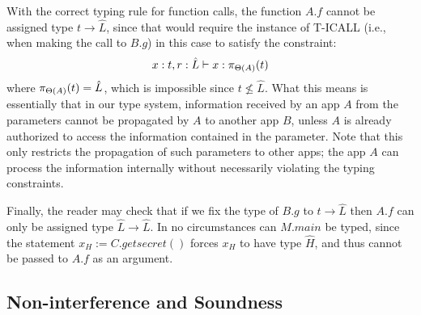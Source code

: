 {{{

With the correct typing rule for function calls, the function $A.f$ cannot be assigned type
$t \rightarrow \hat{L}$, since that would require the instance of T-ICALL (i.e., when making the
call to $B.g$) in this case to satisfy
the constraint:
\[
x : t, r : \hat{L} \vdash x : \app{t}{\Theta(A)}
\]
where $\app{t}{\Theta(A)} = \hat{L}$, which is impossible since $t \not \leq \hat{L}.$ What this
means is essentially that in our type system, information received by an app $A$ from the parameters
cannot be propagated by $A$ to another app $B$, unless $A$ is already authorized to access the
information contained in the parameter. Note that this only restricts the propagation of such parameters
to other apps; the app $A$ can process the information internally without necessarily violating
the typing constraints.

Finally, the reader may check that if we fix the type of $B.g$ to $t \rightarrow \hat{L}$ then
$A.f$ can only be assigned type $\hat{L} \rightarrow \hat{L}.$ In no circumstances can
$M.main$ be typed, since the statement $x_H := C.getsecret()$ forces $x_H$ to have
type $\hat{H}$, and thus cannot be passed to $A.f$ as an argument.



\subsection{Non-interference and Soundness}\label{sec:non-interference}

}}}
